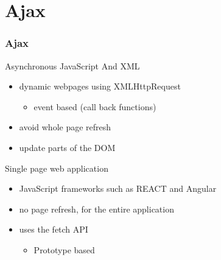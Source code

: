 \section{Ajax}
\begin{frame}[fragile]\frametitle{Ajax}
Asynchronous JavaScript And XML
\begin{itemize}
  \item dynamic webpages using XMLHttpRequest
  \begin{itemize}
    \item event based (call back functions)
  \end{itemize}
  \item avoid whole page refresh
  \item update parts of the DOM
\end{itemize}
Single page web application
\begin{itemize}
  \item JavaScript frameworks such as REACT and Angular
  \item no page refresh, for the entire application
  \item uses the fetch API
  \begin{itemize}
    \item Prototype based
  \end{itemize}
\end{itemize}
\end{frame}

